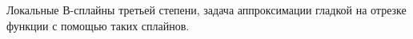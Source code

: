 \documentclass[__main__.tex]{subfiles}
\begin{document}
Локальные В-сплайны третьей степени, задача аппроксимации гладкой на отрезке функции с помощью таких сплайнов.
\end{document}
